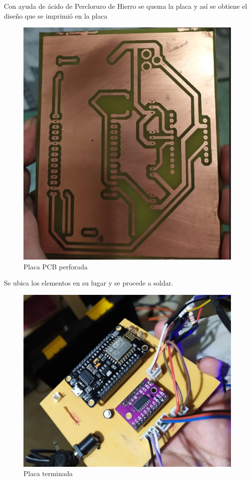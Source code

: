 \documentclass[10pt,a4paper]{article}
\begin{document}
Con ayuda de ácido de Percloruro de Hierro se quema la placa y así se obtiene el diseño que se imprimió en la placa
\begin{figure}[H]
\centering
\includegraphics[scale=0.3]{placa}
\caption{Placa PCB perforada}
\end{figure}

Se ubica los elementos en su lugar y se procede a soldar.
\begin{figure}[H]
\centering
\includegraphics[scale=0.3]{todo}
\caption{Placa terminada }
\end{figure}
\end{document}
